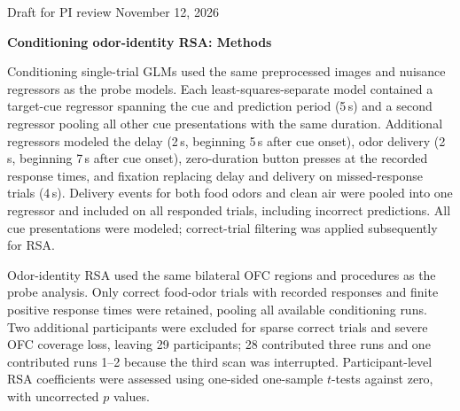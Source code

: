 \documentclass[11pt,letterpaper]{article}
\begin{document}
{\small\sffamily Draft for PI review \hfill November 12, 2026\par}
\vspace{0.4\baselineskip}
{\Large\bfseries Conditioning odor-identity RSA: Methods\par}
\vspace{0.4\baselineskip}

Conditioning single-trial GLMs used the same preprocessed images and nuisance regressors as the probe models. Each least-squares-separate model contained a target-cue regressor spanning the cue and prediction period (5\,s) and a second regressor pooling all other cue presentations with the same duration. Additional regressors modeled the delay (2\,s, beginning 5\,s after cue onset), odor delivery (2\,s, beginning 7\,s after cue onset), zero-duration button presses at the recorded response times, and fixation replacing delay and delivery on missed-response trials (4\,s). Delivery events for both food odors and clean air were pooled into one regressor and included on all responded trials, including incorrect predictions. All cue presentations were modeled; correct-trial filtering was applied subsequently for RSA.

Odor-identity RSA used the same bilateral OFC regions and procedures as the probe analysis. Only correct food-odor trials with recorded responses and finite positive response times were retained, pooling all available conditioning runs. Two additional participants were excluded for sparse correct trials and severe OFC coverage loss, leaving 29 participants; 28 contributed three runs and one contributed runs 1--2 because the third scan was interrupted. Participant-level RSA coefficients were assessed using one-sided one-sample $t$-tests against zero, with uncorrected $p$ values.
\end{document}
